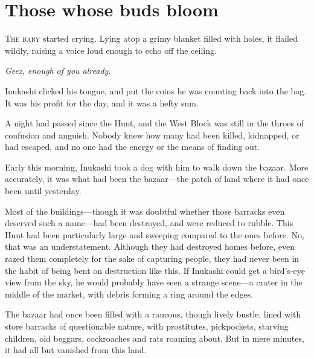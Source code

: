 
\chapter{Those whose buds bloom}


\lettrine{T}{he baby} started crying. Lying atop a grimy blanket filled with holes,
it flailed wildly, raising a voice loud enough to echo off the ceiling.

\emph{Geez, enough of you already.}

Inukashi clicked his tongue, and put the coins he was counting back into
the bag. It was his profit for the day, and it was a hefty sum.

A night had passed since the Hunt, and the West Block was still in the
throes of confusion and anguish. Nobody knew how many had been killed,
kidnapped, or had escaped, and no one had the energy or the means of
finding out.

Early this morning, Inukashi took a dog with him to walk down the
bazaar. More accurately, it was what had been the bazaar---the patch of
land where it had once been until yesterday.

Most of the buildings---though it was doubtful whether those barracks even
deserved such a name---had been destroyed, and were reduced to rubble.
This Hunt had been particularly large and sweeping compared to the ones
before. No, that was an understatement. Although they had destroyed
homes before, even razed them completely for the sake of capturing
people, they had never been in the habit of being bent on destruction
like this. If Inukashi could get a bird's-eye view from the sky, he
would probably have seen a strange scene---a crater in the middle of the
market, with debris forming a ring around the edges.

The bazaar had once been filled with a raucous, though lively bustle,
lined with store barracks of questionable nature, with prostitutes,
pickpockets, starving children, old beggars, cockroaches and rats
roaming about. But in mere minutes, it had all but vanished from this
land.

